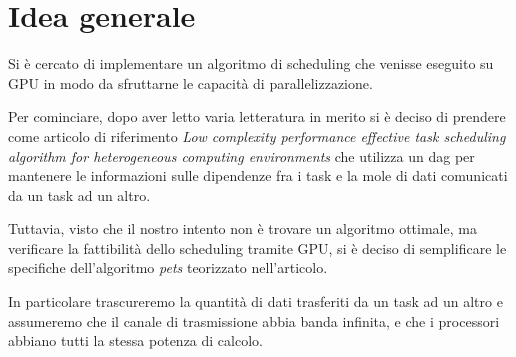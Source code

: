 \documentclass[../relazione.tex]{subfiles}
\begin{document}
\section{Idea generale}
Si è cercato di implementare un algoritmo di scheduling che venisse eseguito su GPU in modo da sfruttarne le capacità di parallelizzazione.

Per cominciare, dopo aver letto varia letteratura in merito si è deciso di prendere come articolo di riferimento \textit{Low complexity performance effective task scheduling algorithm for heterogeneous computing environments}\cite{ilavarasan2007low} che utilizza un \gls{dag} per mantenere le informazioni sulle dipendenze fra i task e la mole di dati comunicati da un task ad un altro.

Tuttavia, visto che il nostro intento non è trovare un algoritmo ottimale, ma verificare la fattibilità dello scheduling tramite GPU, si è deciso di semplificare le specifiche dell'algoritmo \textit{\gls{pets}} teorizzato nell'articolo\cite{ilavarasan2007low}.

In particolare trascureremo la quantità di dati trasferiti da un task ad un altro e assumeremo che il canale di trasmissione abbia banda infinita, e che i processori abbiano tutti la stessa potenza di calcolo.
\end{document}
